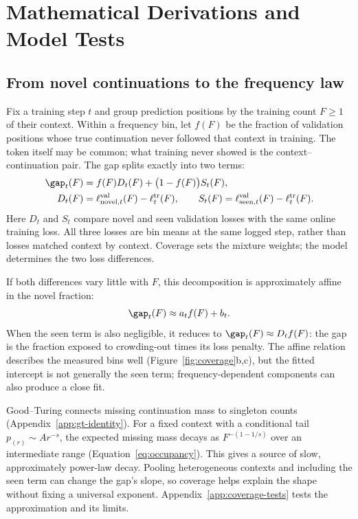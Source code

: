 \section{Mathematical Derivations and Model Tests}
\label{app:math}

\subsection{From novel continuations to the frequency law}
\label{app:coverage}

Fix a training step $t$ and group prediction positions by the training count $F\ge1$ of their context. Within a frequency bin, let $f(F)$ be the fraction of validation positions whose true continuation never followed that context in training. The token itself may be common; what training never showed is the context--continuation pair. The gap splits exactly into two terms:
\begin{equation}
\begin{aligned}
\gap_t(F)&=f(F)D_t(F)+\big(1-f(F)\big)S_t(F),\\
D_t(F)&=\ell^{\mathrm{val}}_{\mathrm{novel},t}(F)-\ell^{\mathrm{tr}}_t(F),\qquad
S_t(F)=\ell^{\mathrm{val}}_{\mathrm{seen},t}(F)-\ell^{\mathrm{tr}}_t(F).
\end{aligned}
\label{eq:gap-decomp}
\end{equation}
Here $D_t$ and $S_t$ compare novel and seen validation losses with the same online training loss. All three losses are bin means at the same logged step, rather than losses matched context by context. Coverage sets the mixture weights; the model determines the two loss differences.

If both differences vary little with $F$, this decomposition is approximately affine in the novel fraction:
\begin{equation}
\gap_t(F)\approx a_t f(F)+b_t.
\label{eq:gap_j}
\end{equation}
When the seen term is also negligible, it reduces to $\gap_t(F)\approx D_t f(F)$: the gap is the fraction exposed to crowding-out times its loss penalty. The affine relation describes the measured bins well (Figure~\ref{fig:coverage}b,c), but the fitted intercept is not generally the seen term; frequency-dependent components can also produce a close fit.

Good--Turing connects missing continuation mass to singleton counts (Appendix~\ref{app:gt-identity}). For a fixed context with a conditional tail $p_{(r)}\sim A r^{-s}$, the expected missing mass decays as $F^{-(1-1/s)}$ over an intermediate range (Equation~\eqref{eq:occupancy}). This gives a source of slow, approximately power-law decay. Pooling heterogeneous contexts and including the seen term can change the gap's slope, so coverage helps explain the shape without fixing a universal exponent. Appendix~\ref{app:coverage-tests} tests the approximation and its limits.

